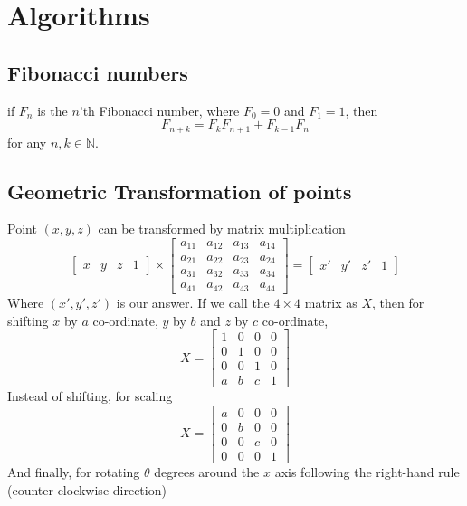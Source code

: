\documentclass[8pt, a4paper, twocolumn]{article}
\begin{document}
\section{Algorithms}
\subsection{Fibonacci numbers}
if $F_n$ is the $n$'th Fibonacci number, where $F_0=0$ and $F_1=1$, then
$$F_{n+k}=F_kF_{n+1}+F_{k-1}F_n$$
for any $n,k\in\mathbb{N}$.
\subsection{Geometric Transformation of points}
Point $(x,y,z)$ can be transformed by matrix multiplication 
\begin{equation*}
\begin{bmatrix}
x & y & z & 1
\end{bmatrix}\times\begin{bmatrix}
a_{11} & a_{12} & a_{13} & a_{14}\\
a_{21} & a_{22} & a_{23} & a_{24}\\
a_{31} & a_{32} & a_{33} & a_{34}\\
a_{41} & a_{42} & a_{43} & a_{44}
\end{bmatrix}=\begin{bmatrix}
x' & y' & z' & 1
\end{bmatrix}
\end{equation*}
Where $(x',y',z')$ is our answer. If we call the $4\times4$ matrix as $X$, then for shifting $x$ by $a$ co-ordinate, $y$ by $b$ and $z$ by $c$ co-ordinate,
\begin{equation*}
X=\begin{bmatrix}
1 & 0 & 0 & 0\\
0 & 1 & 0 & 0\\
0 & 0 & 1 & 0\\
a & b & c & 1
\end{bmatrix}
\end{equation*}
Instead of shifting, for scaling
\begin{equation*}
X=\begin{bmatrix}
a & 0 & 0 & 0\\
0 & b & 0 & 0\\
0 & 0 & c & 0\\
0 & 0 & 0 & 1
\end{bmatrix}
\end{equation*}
And finally, for rotating $\theta$ degrees around the $x$ axis following the right-hand rule (counter-clockwise direction)
\end{document}
